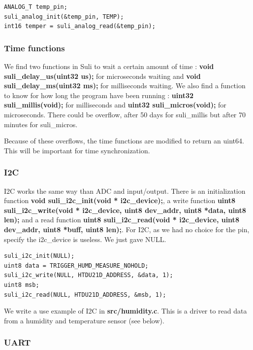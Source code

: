 \begin{lstlisting}[frame=single]
ANALOG_T temp_pin;
suli_analog_init(&temp_pin, TEMP);
int16 temper = suli_analog_read(&temp_pin);
\end{lstlisting}

\subsubsection{Time functions}

We find two functions in Suli to wait a certain amount of time : \textbf{void suli\_delay\_us(uint32 us);} for microseconds waiting and \textbf{void suli\_delay\_ms(uint32 ms);} for milliseconds waiting. We also find a function to know for how long the program have been running : \textbf{uint32 suli\_millis(void);} for milliseconds and \textbf{uint32 suli\_micros(void);} for microseconds. There could be overflow, after 50 days for suli\_millis but after 70 minutes for suli\_micros.

Because of these overflows, the time functions are modified to return an uint64. This will be important for time synchronization.

\subsubsection{I2C}

I2C works the same way than ADC and input/output. There is an initialization function \textbf{void suli\_i2c\_init(void * i2c\_device);}, a write function \textbf{uint8 suli\_i2c\_write(void * i2c\_device, uint8 dev\_addr, uint8 *data, uint8 len);} and a read function \textbf{uint8 suli\_i2c\_read(void * i2c\_device, uint8 dev\_addr, uint8 *buff, uint8 len);}. For I2C, as we had no choice for the pin, specify the i2c\_device is useless. We just gave NULL.

\begin{lstlisting}[frame=single]
suli_i2c_init(NULL);
uint8 data = TRIGGER_HUMD_MEASURE_NOHOLD;
suli_i2c_write(NULL, HTDU21D_ADDRESS, &data, 1);
uint8 msb;
suli_i2c_read(NULL, HTDU21D_ADDRESS, &msb, 1);
\end{lstlisting}

We write a use example of I2C in \textbf{src/humidity.c}. This is a driver to read data from a humidity and temperature sensor (see below).

\subsubsection{UART}

